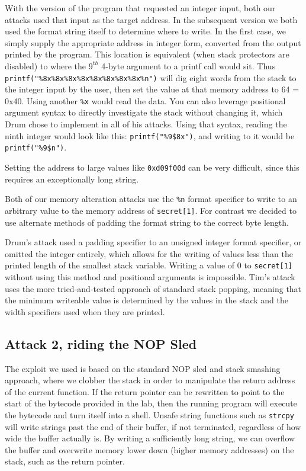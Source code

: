With the version of the program that requested an integer input, both our attacks used that input as the target address.
In the subsequent version we both used the format string itself to determine where to write. In the first case, we
simply supply the appropriate address in integer form, converted from the output printed by the program. This location
is equivalent (when stack protectors are disabled) to where the $9^{th}$ 4-byte argument to a printf call would sit. Thus
{\tt printf("\%8x\%8x\%8x\%8x\%8x\%8x\%8x\%8x\%n")} will dig eight words from the stack to the integer input by the
user, then set the value at that memory address to 64 = 0x40. Using another {\tt\%x} would read the data. You can also
leverage positional argument syntax to directly investigate the stack without changing it, which Drum chose to implement
in all of his attacks. Using that syntax, reading the ninth integer would look like this: {\tt printf("\%9\$8x")}, and
writing to it would be {\tt printf("\%9\$n")}.

Setting the address to large values like {\tt 0xd09f00d} can be very difficult, since this requires an exceptionally
long string.

Both of our memory alteration attacks use the {\tt \%n} format specifier to write to an arbitrary value to the memory
address of {\tt secret[1]}. For contrast we decided to use alternate methods of padding the format string to the correct
byte length.

Drum's attack used a padding specifier to an unsigned integer format specifier, or omitted the integer entirely, which
allows for the writing of values less than the printed length of the smallest stack variable. Writing a value of 0 to
{\tt secret[1]} without using this method and positional arguments is impossible. Tim's attack uses the more
tried-and-tested approach of standard stack popping, meaning that the minimum writeable value is determined by the
values in the stack and the width specifiers used when they are printed.

\subsection{Attack 2, riding the NOP Sled}

The exploit we used is based on the standard NOP sled and stack smashing approach, where we clobber the stack in order
to manipulate the return address of the current function. If the return pointer can be rewritten to point to the start
of the bytecode provided in the lab, then the running program will execute the bytecode and turn itself into a shell.
Unsafe string functions such as {\tt strcpy} will write strings past the end of their buffer, if not terminated,
regardless of how wide the buffer actually is. By writing a sufficiently long string, we can overflow the buffer and
overwrite memory lower down (higher memory addresses) on the stack, such as the return pointer.


